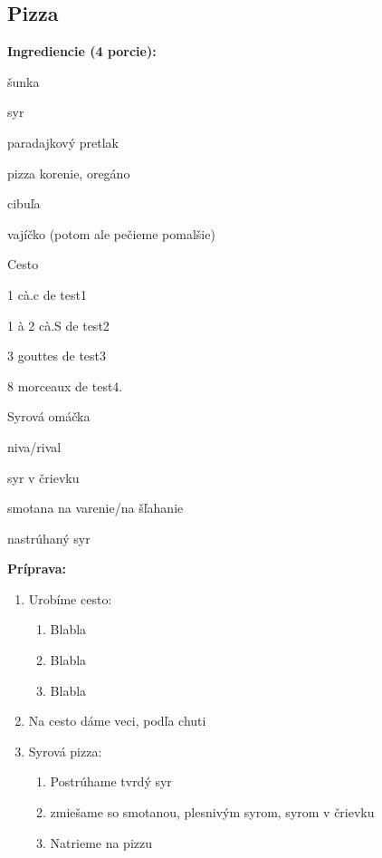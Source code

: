 \setcounter{step}{0}

\subsection{ Pizza }

\begin{ingredient}
  
  \def\portions{  }
  \textbf{ {\normalsize Ingrediencie (4 porcie):} }

  \begin{main}
      \item šunka
      \item syr
      \item paradajkový pretlak
      \item pizza korenie, oregáno
      \item cibuľa
      \item vajíčko (potom ale pečieme pomalšie)
  \end{main}
  
    \begin{subingredient}{Cesto}
        \item 1 cà.c de test1
        \item 1 à 2 cà.S de test2
        \item 3 gouttes de test3
        \item 8 morceaux de test4.
    \end{subingredient}
  
    \begin{subingredient}{Syrová omáčka}
        \item niva/rival
        \item syr v črievku
        \item smotana na varenie/na šľahanie
        \item nastrúhaný syr
    \end{subingredient}
  
\end{ingredient}
\begin{recipe}
\textbf{ {\normalsize Príprava:} }
\begin{enumerate}

  \item{Urobíme cesto: }
      \begin{enumerate}
          \item{Blabla}
          \item{Blabla}
          \item{Blabla}\end{enumerate}
  \item{Na cesto dáme veci, podľa chuti}
  \item{Syrová pizza: }
      \begin{enumerate}
          \item{Postrúhame tvrdý syr}
          \item{zmiešame so smotanou, plesnivým syrom, syrom v črievku}
          \item{Natrieme na pizzu}\end{enumerate}

\end{enumerate}
\end{recipe}

\begin{notes}
  
\end{notes}	
\clearpage

